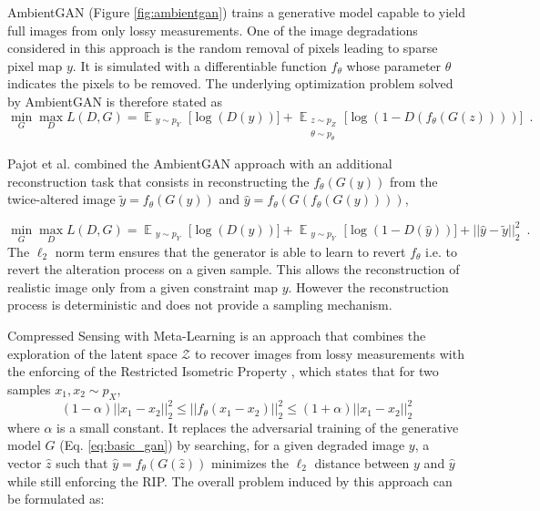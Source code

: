 AmbientGAN \cite{bora2018ambientgan} (Figure \ref{fig:ambientgan}) trains a generative model capable to yield full images from only lossy measurements. One of the image degradations considered in this approach is the random removal of pixels leading to sparse pixel map $y$. It is simulated with a differentiable function $f_\theta$ whose parameter $\theta$ indicates the pixels to be removed. The underlying optimization problem solved by AmbientGAN is therefore stated as
\begin{equation}
\min_G \max_D L(D, G) = \mathop{\mathbb{E}}_{\substack{y\sim p_Y}} \Big[\log(D(y))\Big] + \mathop{\mathbb{E}}_{\substack{z\sim p_Z \\\theta \sim p_\theta}} \Big[ \log(1-D(f_\theta(G(z))))\Big] \enspace.
\end{equation}

Pajot et al. \cite{pajot2018unsupervised} combined the AmbientGAN approach with an additional reconstruction task that consists in reconstructing the $f_\theta(G(y))$ from the twice-altered image $\tilde{y} = f_\theta(G(y))$ and $\hat{y} = f_\theta(G(f_\theta(G(y))))$,

\begin{equation}
\min_G \max_D L(D, G) = \mathop{\mathbb{E}}_{\substack{y\sim p_Y}} \Big[\log(D(y))\Big] + \mathop{\mathbb{E}}_{\substack{y\sim p_Y}} \Big[ \log(1-D(\hat{y}))\Big] + ||\hat{y} - \tilde{y} ||^2_2 \enspace.
\end{equation}
\noindent
The $\ell_2$ norm term ensures that the generator is able to learn to revert $f_\theta$ i.e. to revert the alteration process on a given sample. This  allows the reconstruction of realistic image only from a given constraint map $y$. However the reconstruction process is deterministic and does not provide a sampling mechanism.

Compressed Sensing with Meta-Learning \cite{wu2019deep} is an approach that combines the exploration of the latent space $\mathcal{Z}$ to recover images from lossy measurements with the enforcing of the Restricted Isometric Property \cite{candes2005decoding}, which states that for two samples $x_1,x_2 \sim p_X$, $$(1 - \alpha)||x_1 - x_2||_2^2 \leq ||f_\theta(x_1 - x_2)||_2^2 \leq (1 + \alpha) ||x_1 - x_2||_2^2$$ where $\alpha$ is a small constant.
It replaces the adversarial training of the generative model $G$ (Eq. \ref{eq:basic_gan}) by searching, for a given degraded image $y$, a vector $\hat{z}$ such that $\hat{y} = f_\theta(G(\hat{z}))$ minimizes the $\ell_2$ distance between $y$ and $\hat{y}$ while still enforcing the RIP. The overall problem induced by this approach can be formulated as:

